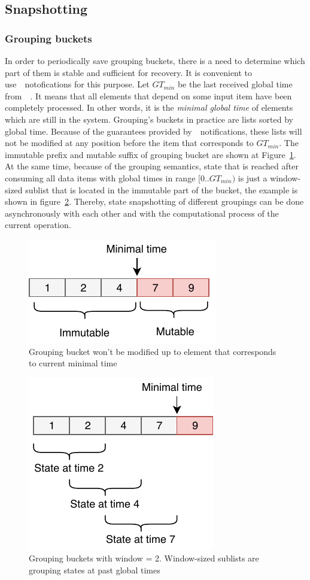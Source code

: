 \subsection{Snapshotting}

\subsubsection{Grouping buckets}

In order to periodically save grouping buckets, there is a need to determine which part of them is stable and sufficient for recovery. It is convenient to use~\Acker\ notofications for this purpose. Let $GT_{min}$ be the last received global time from~\Acker\ . It means that all elements that depend on some input item have been completely processed. In other words, it is the {\em minimal global time} of elements which are still in the system.  Grouping's buckets in practice are lists sorted by global time. Because of the guarantees provided by~\Acker\ notifications, these lists will not be modified at any position before the item that corresponds to $GT_{min}$. The immutable prefix and mutable suffix of grouping bucket are shown at Figure~\ref{immutable}. At the same time, because of the grouping semantics, state that is reached after consuming all data items with global times in range $[0..GT_{min})$ is just a window-sized sublist that is located in the immutable part of the bucket, the example is shown in figure~\ref{substate}. Thereby, state snapshotting of different groupings can be done asynchronously with each other and with the computational process of the current operation. 

\begin{figure}[htbp]
  \centering
  \includegraphics[width=.3\textwidth]{pics/immutable}
  \caption{Grouping bucket won't be modified up to element that corresponds to current minimal time}
  \label {immutable}
\end{figure}

\begin{figure}[htbp]
  \centering
  \includegraphics[width=.3\textwidth]{pics/substate}
  \caption{Grouping buckets with window = 2. Window-sized sublists are grouping states at past global times}
  \label {substate}
\end{figure}

